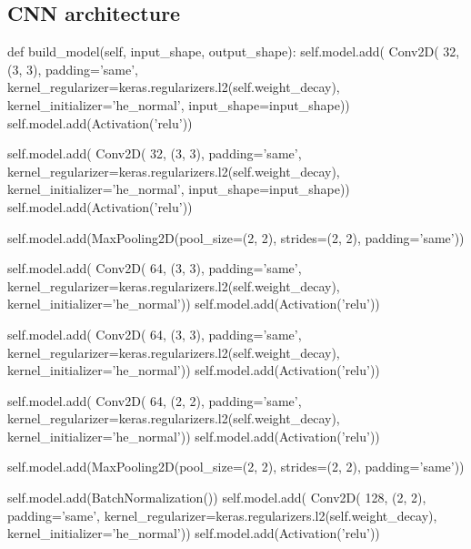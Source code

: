 \begin{appendices}
\section{CNN architecture}
\begin{python}
def build_model(self, input_shape, output_shape):
        self.model.add(
            Conv2D(
                32,
                (3, 3),
                padding='same',
                kernel_regularizer=keras.regularizers.l2(self.weight_decay),
                kernel_initializer='he_normal',
                input_shape=input_shape))
        self.model.add(Activation('relu'))

        self.model.add(
            Conv2D(
                32,
                (3, 3),
                padding='same',
                kernel_regularizer=keras.regularizers.l2(self.weight_decay),
                kernel_initializer='he_normal',
                input_shape=input_shape))
        self.model.add(Activation('relu'))

        self.model.add(MaxPooling2D(pool_size=(2, 2),
                                    strides=(2, 2),
                                    padding='same'))

        self.model.add(
            Conv2D(
                64,
                (3, 3),
                padding='same',
                kernel_regularizer=keras.regularizers.l2(self.weight_decay),
                kernel_initializer='he_normal'))
        self.model.add(Activation('relu'))

        self.model.add(
            Conv2D(
                64,
                (3, 3),
                padding='same',
                kernel_regularizer=keras.regularizers.l2(self.weight_decay),
                kernel_initializer='he_normal'))
        self.model.add(Activation('relu'))

        self.model.add(
            Conv2D(
                64,
                (2, 2),
                padding='same',
                kernel_regularizer=keras.regularizers.l2(self.weight_decay),
                kernel_initializer='he_normal'))
        self.model.add(Activation('relu'))

        self.model.add(MaxPooling2D(pool_size=(2, 2),
                                    strides=(2, 2),
                                    padding='same'))

        self.model.add(BatchNormalization())
        self.model.add(
            Conv2D(
                128,
                (2, 2),
                padding='same',
                kernel_regularizer=keras.regularizers.l2(self.weight_decay),
                kernel_initializer='he_normal'))
        self.model.add(Activation('relu'))


\end{python}
\end{appendices}
